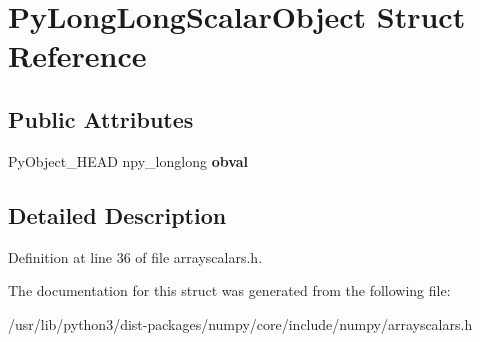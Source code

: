 \hypertarget{structPyLongLongScalarObject}{}\section{Py\+Long\+Long\+Scalar\+Object Struct Reference}
\label{structPyLongLongScalarObject}
\subsection*{Public Attributes}
\begin{DoxyCompactItemize}
\item 
Py\+Object\+\_\+\+H\+E\+AD npy\+\_\+longlong {\bfseries obval}\hypertarget{structPyLongLongScalarObject_a019fab57ecf553654c7f5465a88bce91}{}\label{structPyLongLongScalarObject_a019fab57ecf553654c7f5465a88bce91}

\end{DoxyCompactItemize}


\subsection{Detailed Description}


Definition at line 36 of file arrayscalars.\+h.



The documentation for this struct was generated from the following file\+:\begin{DoxyCompactItemize}
\item 
/usr/lib/python3/dist-\/packages/numpy/core/include/numpy/arrayscalars.\+h\end{DoxyCompactItemize}
